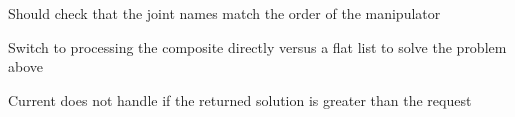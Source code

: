 \begin{DoxyRefList}
\label{todo__todo000017}%
%
Should check that the joint names match the order of the manipulator  
\item[Member \mbox{\hyperlink{classtesseract__planning_1_1OMPLMotionPlanner_acbe96b10701a59c016d78ba4aae922eb}{tesseract\+\_\+planning\+::OMPLMotion\+Planner\+::solve}} (const \mbox{\hyperlink{structtesseract__planning_1_1PlannerRequest}{Planner\+Request}} \&request) const override]\label{todo__todo000016}%
%
Switch to processing the composite directly versus a flat list to solve the problem above ~\newline
 

\label{todo__todo000015}%
%
Current does not handle if the returned solution is greater than the request 


\end{DoxyRefList}

